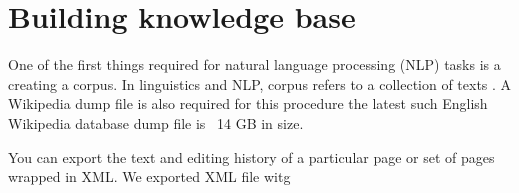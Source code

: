 \chapter*{Building knowledge base}


One of the first things required for natural language processing (NLP) tasks is a creating a corpus. In linguistics and NLP, corpus refers to a collection of texts \parencite{kdnug}.
A Wikipedia dump file is also required for this procedure the latest such English Wikipedia database dump file is ~14 GB in size.

You can export the text and editing history of a particular page or set of pages wrapped in XML. \parencite{wkpd}
We exported XML file witg 


